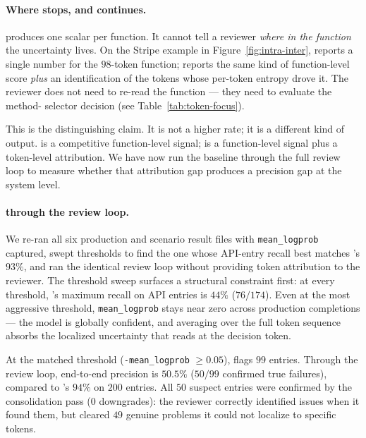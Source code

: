 \paragraph{Where \papg stops, and \eps continues.}
\papg produces one scalar per function. It cannot tell a reviewer
\emph{where in the function} the uncertainty lives. On the Stripe
example in Figure~\ref{fig:intra-inter}, \papg reports a single
number for the $98$-token function; \eps reports the same kind of
function-level score \emph{plus} an identification of the tokens
whose per-token entropy drove it. The reviewer does not need
to re-read the function --- they need to evaluate the method-%
selector decision (see Table~\ref{tab:token-focus}).

This is the distinguishing claim. It is not a higher rate; it is a
different kind of output. \papg is a competitive function-level
signal; \eps is a function-level signal plus a token-level attribution.
We have now run the \papg baseline through the full review loop to
measure whether that attribution gap produces a precision gap at the
system level.

\paragraph{\papg through the review loop.}
We re-ran all six production and scenario result files with
\texttt{mean\_logprob} captured, swept \papg thresholds to find the
one whose API-entry recall best matches \eps's $93\%$, and ran the
identical review loop without providing token attribution to the reviewer.
The threshold sweep surfaces a structural constraint first: at every
threshold, \papg's maximum recall on API entries is $44\%$ ($76/174$).
Even at the most aggressive threshold, \texttt{mean\_logprob} stays
near zero across production completions --- the model is globally
confident, and averaging over the full token sequence absorbs the
localized uncertainty that \eps reads at the decision token.

At the matched threshold (\texttt{-mean\_logprob} $\ge 0.05$),
\papg flags $99$ entries. Through the review loop, end-to-end
precision is $50.5\%$ ($50/99$ confirmed true failures), compared
to \eps's $94\%$ on $200$ entries. All $50$ suspect entries were
confirmed by the consolidation pass ($0$ downgrades): the reviewer
correctly identified issues when it found them, but cleared $49$
genuine problems it could not localize to specific tokens.

